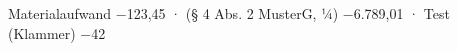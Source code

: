 \documentclass{article}
\begin{document}
Materialaufwand −123,45 · (§ 4 Abs. 2 MusterG, ¼) −6.789,01 · Test (Klammer) −42
\end{document}
